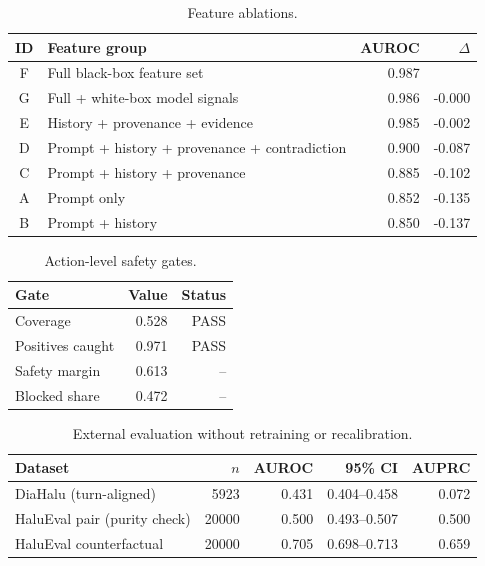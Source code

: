 \begin{table}[t]
\centering
\caption{Feature ablations.}
\label{tab:ablation}
\small
\begin{tabular}{clrr}
\toprule
ID & Feature group & AUROC & $\Delta$ \\
\midrule
F & Full black-box feature set & 0.987 \\
G & Full + white-box model signals & 0.986 & -0.000 \\
E & History + provenance + evidence & 0.985 & -0.002 \\
D & Prompt + history + provenance + contradiction & 0.900 & -0.087 \\
C & Prompt + history + provenance & 0.885 & -0.102 \\
A & Prompt only & 0.852 & -0.135 \\
B & Prompt + history & 0.850 & -0.137 \\
\bottomrule
\end{tabular}
\end{table}
\begin{table}[t]
\centering
\caption{Action-level safety gates.}
\label{tab:gates}
\small
\begin{tabular}{lrr}
\toprule
Gate & Value & Status \\
\midrule
Coverage & 0.528 & PASS \\
Positives caught & 0.971 & PASS \\
Safety margin & 0.613 & -- \\
Blocked share & 0.472 & -- \\
\bottomrule
\end{tabular}
\end{table}
\begin{table}[t]
\centering
\caption{External evaluation without retraining or recalibration.}
\label{tab:external}
\small
\begin{tabular}{lrrrr}
\toprule
Dataset & $n$ & AUROC & 95\% CI & AUPRC \\
\midrule
DiaHalu (turn-aligned) & 5923 & 0.431 & 0.404--0.458 & 0.072 \\
HaluEval pair (purity check) & 20000 & 0.500 & 0.493--0.507 & 0.500 \\
HaluEval counterfactual & 20000 & 0.705 & 0.698--0.713 & 0.659 \\
\bottomrule
\end{tabular}
\end{table}

